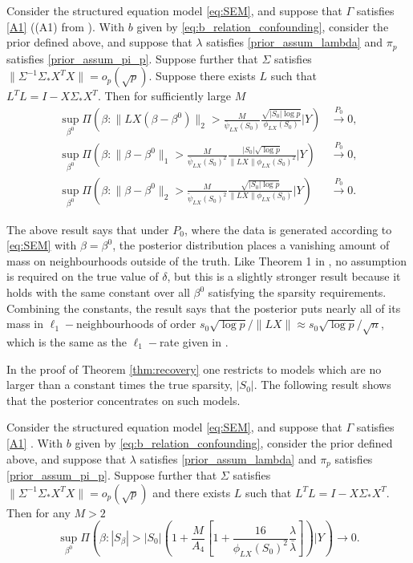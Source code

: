 \documentclass[11pt]{article}
\newcommand{\postCov}{\Sigma_*}
\numberwithin{equation}{section}
\begin{document}
\begin{theorem}\label{thm:recovery}
		Consider the structured equation model \eqref{eq:SEM}, and suppose that {\color{assumption} $\Gamma$ satisfies \eqref{A1}} ((A1) from \cite{CBM2020}). With $b$ given by \eqref{eq:b_relation_confounding}, consider the prior defined above, and suppose that {\color{assumption} $\lambda$ satisfies \eqref{prior_assum_lambda} and $\pi_p$ satisfies \eqref{prior_assum_pi_p}}. Suppose further that $\Sigma$ satisfies {\color{assumption}$\|\Sigma^{-1} \postCov X^TX\| = o_p(\sqrt{p})$}. Suppose there exists $L$ such that $L^TL = I - X\postCov X^T$.
		  Then for sufficiently large $M$
\begin{align*}
	\sup_{\beta^0} \Pi\left(\beta: \|LX(\beta - \beta^0)\|_2 > \frac{M}{\bar{\psi}_{LX}(S_0)} \frac{\sqrt{|S_0|\log p}}{\phi_{LX}(S_0)} | Y \right) &\xrightarrow{P_0} 0, \\
		\sup_{\beta^0} \Pi\left(\beta: \|\beta - \beta^0\|_1 > \frac{M}{\bar{\psi}_{LX}(S_0)^2} \frac{|S_0|\sqrt{\log p}}{\|LX\|\phi_{LX}(S_0)^2} | Y \right) &\xrightarrow{P_0} 0, \\
		\sup_{\beta^0} \Pi\left(\beta: \|\beta - \beta^0\|_2 > \frac{M}{\tilde{\psi}_{LX}(S_0)^2} \frac{\sqrt{|S_0|\log p}}{\|LX\|\phi_{LX}(S_0)} | Y \right) &\xrightarrow{P_0} 0.
\end{align*}
\end{theorem}
The above result says that under $P_0$, where the data is generated according to \eqref{eq:SEM} with $\beta = \beta^0$, the posterior distribution places a vanishing amount of mass on neighbourhoods outside of the truth. Like Theorem 1 in \cite{CBM2020}, no assumption is required on the true value of $\delta$, but this is a slightly stronger result because it holds with the same constant over all $\beta^0$ satisfying the sparsity requirements. Combining the constants, the result says that the posterior puts nearly all of its mass in $\ell_1-$neighbourhoods of order $s_0 \sqrt{\log p}/\|LX\| \approx s_0 \sqrt{\log p}/\sqrt{n}$, which is the same as the $\ell_1-$rate given in \cite{CBM2020}.

In the proof of Theorem \ref{thm:recovery} one restricts to models which are no larger than a constant times the true sparsity, $|S_0|$. The following result shows that the posterior concentrates on such models.


\begin{theorem}[Dimension]\label{thm:dimension}
		Consider the structured equation model \eqref{eq:SEM}, and suppose that {\color{assumption} $\Gamma$ satisfies \eqref{A1}} . With $b$ given by \eqref{eq:b_relation_confounding}, consider the prior defined above, and suppose that {\color{assumption} $\lambda$ satisfies  \eqref{prior_assum_lambda} and $\pi_p$ satisfies \eqref{prior_assum_pi_p}}. Suppose further that $\Sigma$ satisfies {\color{assumption}$\|\Sigma^{-1} \postCov  X^TX\| = o_p(\sqrt{p})$} and there exists $L$ such that $L^TL = I - X\postCov X^T$.
Then for any $M > 2$
$$
	\sup_{\beta^0} \Pi\left(\beta: |S_\beta| > |S_0|\left(1 + \frac{M}{A_4}\left[1 + \frac{16}{\phi_{LX}(S_0)^2}\frac{\lambda}{\bar{\lambda}} \right]\right) | Y \right) \rightarrow 0.
$$
\end{theorem}
\end{document}
